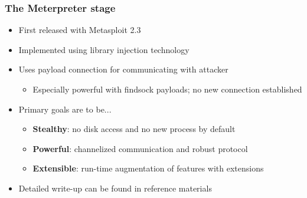 \documentclass{beamer}
\newenvironment{sitemize}{\vspace{1mm}\begin{itemize}\itemsep 4pt\small}{\end{itemize}}
\begin{document}
\begin{frame}[t]
    \frametitle{The Meterpreter stage}

    \begin{sitemize}
        \item First released with Metasploit 2.3
        \item Implemented using library injection technology

        \pause
        \item Uses payload connection for communicating with
        attacker
        \begin{sitemize}
            \item Especially powerful with findsock payloads; no new
            connection established
        \end{sitemize}
    \end{sitemize}

    \pause
    \begin{sitemize}
        \item Primary goals are to be...
        \begin{sitemize}
            \item \textbf{Stealthy}: no disk access and no new process by default
            \item \textbf{Powerful}: channelized communication and robust protocol
            \item \textbf{Extensible}: run-time augmentation of features with extensions
        \end{sitemize}
    \end{sitemize}

    \pause
    \begin{sitemize}
        \item Detailed write-up can be found in reference materials
    \end{sitemize}
\end{frame}
\end{document}
